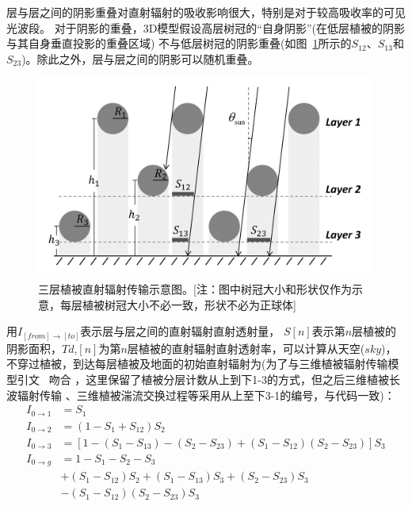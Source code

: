 层与层之间的阴影重叠对直射辐射的吸收影响很大，特别是对于较高吸收率的可见光波段。
对于阴影的重叠，3D模型假设高层树冠的“自身阴影”(在低层植被的阴影与其自身垂直投影的重叠区域)
不与低层树冠的阴影重叠(如图~\ref{fig:三层植被结构示意图}所示的$S_{12}$、$S_{13}$和$S_{23}$)。除此之外，层与层之间的阴影可以随机重叠。%
{
\begin{figure}[htbp]
\centering
\includegraphics[width=0.8\columnwidth]{Figures/辐射过程及辐射通量计算/三层植被结构示意图.png}
\caption[三层植被直射辐射传输示意图]{三层植被直射辐射传输示意图。[注：图中树冠大小和形状仅作为示意，每层植被树冠大小不必一致，形状不必为正球体]}
\label{fig:三层植被结构示意图}
\end{figure}
}
用$I_{\left[from\right]\rightarrow\left[to\right]}$表示层与层之间的直射辐射直射透射量，
$S[n]$表示第$n$层植被的阴影面积，$Td$,$[n]$为第$n$层植被的直射辐射直射透射率，可以计算从天空($sky$)，
不穿过植被，到达每层植被及地面的初始直射辐射为(为了与三维植被辐射传输模型引文~\citep{yuan20143d} 吻合
，这里保留了植被分层计数从上到下1-3的方式，但之后三维植被长波辐射传输
、三维植被湍流交换过程等采用从上至下3-1的编号，与代码一致)：
\begin{equation}
\begin{aligned} I_{0 \rightarrow 1} &=S_{1} \\ I_{0 \rightarrow 2} &=\left(1-S_{1}+S_{12}\right) S_{2} \\ 
    I_{0 \rightarrow 3} &=\left[1-\left(S_{1}-S_{13}\right)-\left(S_{2}-S_{23}\right)+\left(S_{1}-S_{12}\right)\left(S_{2}-S_{23}\right)\right] S_{3} \\ 
    I_{0 \rightarrow g} &=1-S_{1}-S_{2}-S_{3} \\ &+\left(S_{1}-S_{12}\right) S_{2}+\left(S_{1}-S_{13}\right) S_{3}+\left(S_{2}-S_{23}\right) S_{3} \\
     &-\left(S_{1}-S_{12}\right)\left(S_{2}-S_{23}\right) S_{3} \end{aligned}
\end{equation}
